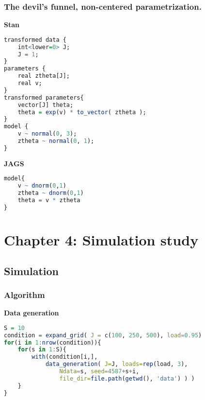 
\subsubsection{The devil's funnel, non-centered parametrization.}

\noindent \textbf{Stan}
%
\begin{lstlisting}[language=R]
transformed data {
	int<lower=0> J;
	J = 1;
}
parameters {
	real ztheta[J];
	real v;
}
transformed parameters{
	vector[J] theta;
	theta = exp(v) * to_vector( ztheta );
}
model {
	v ~ normal(0, 3);
	ztheta ~ normal(0, 1);
}
\end{lstlisting}


\noindent \textbf{JAGS}
%
\begin{lstlisting}[language=R]
model{
	v ~ dnorm(0,1)
	ztheta ~ dnorm(0,1)
	theta = v * ztheta
}
\end{lstlisting}




\section{Chapter 4: Simulation study} \label{appC2:chapter4}

\subsection{Simulation} \label{appC2_1:sim}

\subsubsection{Algorithm}

\noindent \textbf{Data generation}
%
\begin{lstlisting}[language=R]
S = 10
condition = expand_grid( J = c(100, 250, 500), load=0.95)
for(i in 1:nrow(condition)){
	for(s in 1:S){
		with(condition[i,],
			data_generation( J=J, loads=rep(load, 3), 
				Ndata=s, seed=4587+s+i,
				file_dir=file.path(getwd(), 'data') ) )
	}
}
\end{lstlisting}

